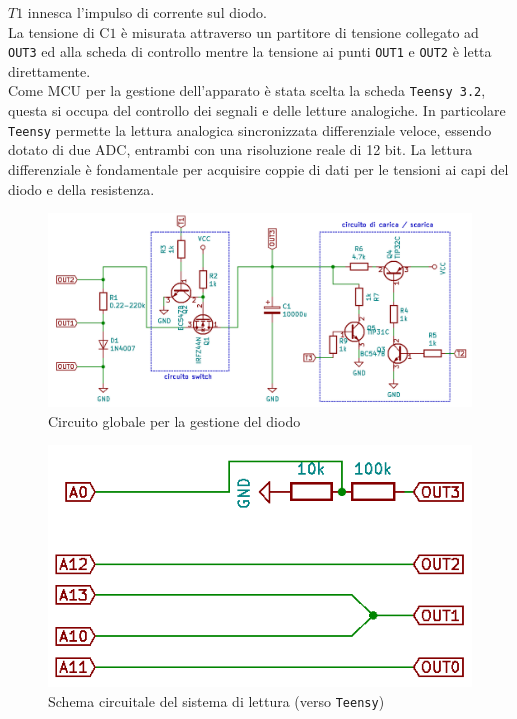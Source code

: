 \documentclass{article}[a4paper, oneside, 11pt]
\begin{document}
$T1$ innesca l'impulso di corrente sul diodo.\\
La tensione di C$1$ è misurata attraverso un partitore di tensione collegato ad 
\verb+OUT3+ ed alla scheda di controllo mentre la tensione ai punti \verb+OUT1+ e
\verb+OUT2+ è letta direttamente.\\
Come MCU per la gestione dell'apparato è stata scelta la scheda 
\verb+Teensy 3.2+\cite{teensy}, questa si occupa del controllo dei segnali e delle letture 
analogiche. In particolare \verb+Teensy+  permette la lettura analogica 
sincronizzata differenziale veloce, essendo dotato di due ADC, entrambi con una 
risoluzione reale di 12 bit. La lettura differenziale è fondamentale per 
acquisire coppie di dati per le tensioni ai capi del diodo e della 
resistenza.

\begin{figure}[H]
	\centering 
 		\includegraphics[scale=0.5]{./gestione.png}
 	\caption{Circuito globale per la gestione del diodo \label{sch:gest}}
\end{figure}
\begin{figure}[H]
	\centering 
 		\includegraphics[scale=0.5]{./measure.png}
 	\caption{Schema circuitale del sistema di lettura (verso \texttt{Teensy})
	\label{sch:rdng}}
\end{figure}
\end{document}
